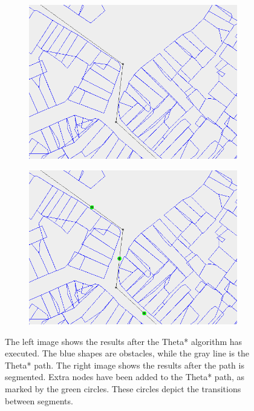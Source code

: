 \begin{figure}[!t]
    \centering
    \begin{subfigure}[t]{0.47\textwidth}
        \includegraphics[width=\textwidth]{img/pre1}
    \end{subfigure}
    \hfil
    \begin{subfigure}[t]{0.47\textwidth}
        \includegraphics[width=\textwidth]{img/pre2}
    \end{subfigure}
    \caption{The left image shows the results after the Theta* algorithm has executed. The blue shapes are obstacles, while the gray line is the Theta* path. The right image shows the results after the path is segmented. Extra nodes have been added to the Theta* path, as marked by the green circles. These circles depict the transitions between segments.}\label{fig:pre-1-2}
\end{figure}

